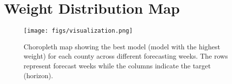 \appendix
\section{Weight Distribution Map}
\label{app:WDM}
\begin{figure}
    \centering
    \texttt{[image: figs/visualization.png]}
    \caption{Choropleth map showing the best model (model with the highest weight) for each county across different forecasting weeks. The rows represent forecast weeks while the columns indicate the target (horizon).}
    \label{fig:weights_all}
\end{figure}